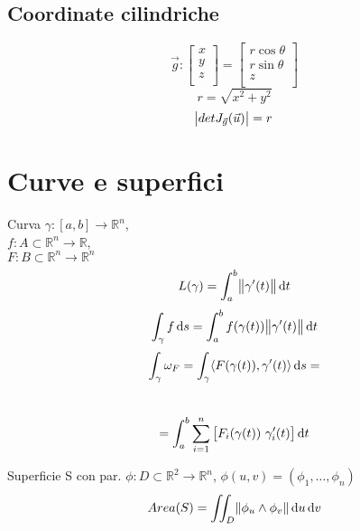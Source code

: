 \documentclass[a4paper,portrait,columns=3,5pt]{cheatsheet}
\begin{document}
\subsection{Coordinate cilindriche}
\begin{equation*}
	\vec{g} :
	\begin{bmatrix}
		x \\
		y \\
		z \\
	\end{bmatrix} =
	\begin{bmatrix}
		r \cos \theta \\
		r \sin \theta \\
		z             \\
	\end{bmatrix}
\end{equation*}
\begin{equation*}
	r = \sqrt{x^2 + y^2}
\end{equation*}
\begin{equation*}
	\abs{detJ_{\vec{g}}(\vec{u})} = r
\end{equation*}
\section{Curve e superfici}
Curva $\gamma:[a,b]\rightarrow\mathbb{R}^n$,\\ $f:A\subset{\mathbb{R}^n}\rightarrow\mathbb{R}$, \\
$F:B\subset\mathbb{R}^n\rightarrow\mathbb{R}^n$
$$ L(\gamma) = \int_{a}^{b} \norm{\gamma'(t)} \dif t$$
$$ \int_{\gamma} f\dif s = \int_a^b f(\gamma(t)) \norm{\gamma'(t)} \dif t$$
$$ \int_\gamma \omega_{F} = \int_\gamma \langle F(\gamma(t)), \gamma'(t)\rangle \dif s = $$\\
$$ = \int_a^b \sum_{i=1}^n\left[F_i(\gamma(t))~\gamma_i'(t)\right] \dif t$$

Superficie S con par. $\phi:D\subset\mathbb{R}^2\rightarrow\mathbb{R}^n$, $\phi(u, v) = (\phi_1, \dots, \phi_n)$\\
$$ Area(S) = \iint_D \norm{\phi_u \wedge \phi_v} \dif u \dif v$$
\end{document}
